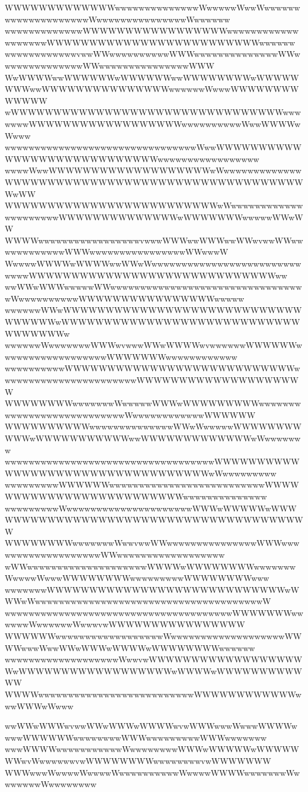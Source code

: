 \documentclass[a4paper]{article}
\begin{document}
\begin{procgrass}{\NabeAzz}
WWWWWWWWWWWWWwwwwwwwwwwwwwwWwwwwwWwwWwwwwwwwwwwwwwwwwwwwwWwwwwwwwwwwwwwwwWwwwwww
wwwwwwwwwwwwwWWWWWWWWWWWWWWWWWwwwwwwwwwwwwwwwwwwwWWWWWWWWWWWWWWWWWWWWWWWWWwwwwww
wwwwwwwwwwwwvwwWWwwwwwwwwwwWWWwwwwwwwwwwwwwwWWwwwwwwwwwwwwwwWWwwwwwwwwwwwwwwwWWW
WwWWWWwwWWWWWWwWWWWWWwwWWWWWWWWwWWWWWWWWwwWWWWWWWWWWWWWWWwwwwwwWwwwWWWWWWWWWWWWW
wWWWWWWWWWWWWWWWWWWWWWWWWWWWWWWWWwwwwwwwWWWWWWWWWWWWWWWWWWwwwwwwwwwwWwwWWWWwWwww
wwwwwwwwwwwwwwwwwwwwwwwwwwwwwwwwWwwWWWWWWWWWWWWWWWWWWWWWWWWWWWWwwwwwwwwwwwwwwwww
wwwwWwwWWWWWWWWWWWWWWWWWWWwWwwwwwwwwwwwwwWWWWWWWWWWWWWWWWWWWWWWWWWWWWWWWWWWWWwWW
WWWWWWWWWWWWWWWWWWWWWWWWWwWwwwwwwwwwwwwwwwwwwwwwWWWWWWWWWWWWWWwWWWWWWWwwwwwWWwWW
WWWWwwwwwwwwwwwwwwwwwvwwwWWWwwWWWwwWWwvwwWWwwwwwwwwwwwwWWWwwwwwwwwwwwwwwwwWWwwwW
WwwwwWWWWwWWWWwwWWwWwwwwwwwwwwwwwwwwwwwwwwwwwwwwwWWWWWWWWWWWWWWWWWWWWWWWWWWWWWww
wwWWwWWWwwwwwWWwwwwwwwwwwwwwwwwwwwwwwwwwwwwwwwwwWwwwwwwwwwwWWWWWWWWWWWWWWWWwwwww
wwwwwwWWwWWWWWWWWWWWWWWWWWWWWWWWWWWWWWWWWWWwWWWWWWWWWWWWWWWWWWWWWWWWWWWWWWWWWWWw
wwwwwwWwwwwwwwWWWwvwwwWWwWWWWwvwwwwwwWWWWWWwwwwwwwwwwwwwwwwwwWWWWWWWwwwwwwwwwwww
wwwwwwwwwwWWWWWWWWWWWWWWWWWWWWWWWWWWWwwwwwwwwwwwwwwwwwwwwwwwWWWWWWWWWWWWWWWWWWWW
WWWWWWWWwwwwwwwWwwwwwWWWwWWWWWWWWWwwwwwwwwwwwwwwwwwwwwwwwwwwwWwwwwwwwwwwwwWWWWWW
WWWWWWWWWWwwwwwwwwwwwwwwWWwWwwwwwWWWWWWWWWWWwWWWWWWWWWWWwwWWWWWWWWWWWWWwWwwwwwww
wwwwwwwwwwwwwwwwwwwwwwwwwwwwwwwwwwwWWWWWWWWWWWWWWWWWWWWWWWWWWWWWWWWWWwWwwwwwwwww
wwwwwwwwwWWWWWWwwwwwwwwwwwwwwwwwwwwwwwwwwWWWWWWWWWWWWWWWWWWWWWWWWWwwwwwwwwwwwwww
wwwwwwwwwWwwwwwwwwwwwwwwwwwwwwwWWWwWWWWWwWWWWWWWWWWWWWWWWWWWWWWWWWWWWWWWWWWWWWWW
WWWWWWWWwwwwwwwWwwvwwWWwwwwwwwwwwwwwwwWWWwwwwwwwwwwwwwwwwwwwWWwwwwwwwwwwwwwwwwww
wWWwwwwwwwwwwwwwwwwwwwwWWWWwWWWWWWWWwwwwwwwWwwwwWwwwWWWWWWWWwwwwwwwwwWWWWWWWWwww
wwwwwwwWWWWWWWWWWWWWWWWWWWWWWWWWWWWwWWWwWwwwwwwwwwwwwwwwwwwwwwwwwwwwwwwwwwwwwwwW
wwwwwwwwwwwwwwwwwwwwwwwwwwwwwwwwwwwwwwWWWWWWWwwwwwwWwwwwwwWwwwvwWWWWWWWWWWWWWWWW
WWWWWWwwwwwwwwwwwwwwwwwwWwwwwwwwwwwwwwwwwwwwWWWWwwwWwwWWwWWWwWWWWwWWWWWWWWwwwwww
wwwwwwwwwwwwwwwwwwwWwwvwWWWWWWWWWWWWWWWWWWWwWWWWWWWWWWWWWWWWWWwWWWWwWWWWWWWWWWWW
WWWWwwwwwwwwwwwwwwwwwwwwwwwwwwWWWWWWWWWWWWwwwWWWwWwww
\end{procgrass}
\newcommand*{\AhoFont}{\usefont{OT1}{cmfr}{m}{it}\LARGE}


\begin{procgrass}{\echo}
wwWWwWWWwvwwWWwWWWwWWWWwvwWWWwwwWwwwWWWWwwwwWWWWWWwwwwwwwwWWWwwwwwwwwwWWWwwwwwww
wwwWWWWwwwwwwwwwwwWwwwwwwwwWWWwWWWWWwWWWWWWWwvWwwwwwwvwWWWWWWWWwwwwwwwwvwWWWWWWW
WWWwwwWwwwwWwwwwWwwwwwwwwwwWwwwwWWWWwwwwwwwWwwwwwwwWwwwwwwww
\end{procgrass}

\noindent{}
\end{document}
